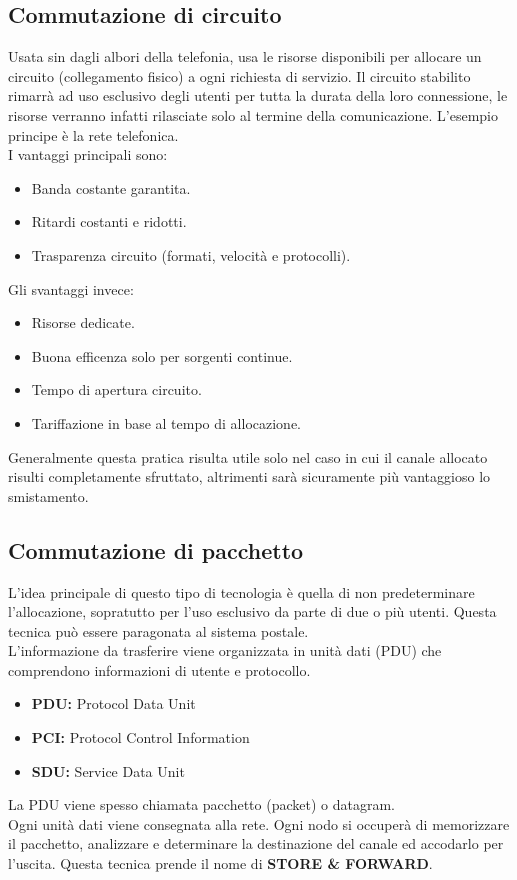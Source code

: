 \documentclass[12pt]{article}
\begin{document}
\subsection{Commutazione di circuito}
Usata sin dagli albori della telefonia, usa le risorse disponibili per allocare un circuito (collegamento fisico) a ogni richiesta di servizio. Il circuito stabilito rimarrà ad uso esclusivo degli utenti per tutta la durata della loro connessione, le risorse verranno infatti rilasciate solo al termine della comunicazione. L'esempio principe è la rete telefonica.\\
I vantaggi principali sono:
\begin{itemize}
  \item Banda costante garantita.
  \item Ritardi costanti e ridotti.
  \item Trasparenza circuito (formati, velocità e protocolli).
\end{itemize}
Gli svantaggi invece:
\begin{itemize}
  \item Risorse dedicate.
  \item Buona efficenza solo per sorgenti continue.
  \item Tempo di apertura circuito.
  \item Tariffazione in base al tempo di allocazione.
\end{itemize}
Generalmente questa pratica risulta utile solo nel caso in cui il canale allocato risulti completamente sfruttato, altrimenti sarà sicuramente più vantaggioso lo smistamento.
\subsection{Commutazione di pacchetto}
L'idea principale di questo tipo di tecnologia è quella di non predeterminare l'allocazione, sopratutto per l'uso esclusivo da parte di due o più utenti. Questa tecnica può essere paragonata al sistema postale.\\
L'informazione da trasferire viene organizzata in unità dati (PDU) che comprendono informazioni di utente e protocollo.
\begin{itemize}
  \item \textbf{PDU:} Protocol Data Unit
  \item \textbf{PCI:} Protocol Control Information
  \item \textbf{SDU:} Service Data Unit
\end{itemize}
La PDU viene spesso chiamata pacchetto (packet) o datagram.\\
Ogni unità dati viene consegnata alla rete. Ogni nodo si occuperà di memorizzare il pacchetto, analizzare e determinare la destinazione del canale ed accodarlo per l'uscita. Questa tecnica prende il nome di \textbf{STORE \& FORWARD}.
\end{document}
